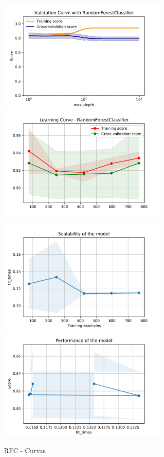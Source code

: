 \documentclass[12pt,twoside]{report}
\begin{document}
\begin{figure}[ht!]
\begin{multicols}{2}
\includegraphics[width=8.5cm]{./code/figures_python/validation_curves/rfc.pdf}%
\columnbreak
\includegraphics[width=8.5cm]{./code/figures_python/learning_curves/rfc.pdf}%
\end{multicols}

\begin{multicols}{2}
\includegraphics[width=8.5cm]{./code/figures_python/learning_curves/rfc_scalability.pdf}%
\columnbreak
\includegraphics[width=8.5cm]{./code/figures_python/learning_curves/rfc_performance.pdf}%
\end{multicols}
\caption{RFC - Curvas}
\label{rfc:curves}
\end{figure}
\end{document}
